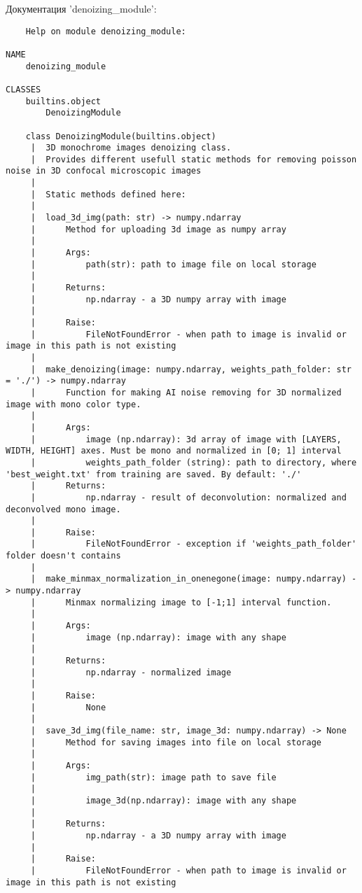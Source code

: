 Документация 'denoizing\_module':
\begin{lstlisting}
	Help on module denoizing_module:

NAME
    denoizing_module

CLASSES
    builtins.object
        DenoizingModule
    
    class DenoizingModule(builtins.object)
     |  3D monochrome images denoizing class.
     |  Provides different usefull static methods for removing poisson noise in 3D confocal microscopic images
     |  
     |  Static methods defined here:
     |  
     |  load_3d_img(path: str) -> numpy.ndarray
     |      Method for uploading 3d image as numpy array
     |      
     |      Args:
     |          path(str): path to image file on local storage
     |      
     |      Returns:
     |          np.ndarray - a 3D numpy array with image
     |      
     |      Raise:
     |          FileNotFoundError - when path to image is invalid or image in this path is not existing
     |  
     |  make_denoizing(image: numpy.ndarray, weights_path_folder: str = './') -> numpy.ndarray
     |      Function for making AI noise removing for 3D normalized image with mono color type.
     |      
     |      Args:
     |          image (np.ndarray): 3d array of image with [LAYERS, WIDTH, HEIGHT] axes. Must be mono and normalized in [0; 1] interval
     |          weights_path_folder (string): path to directory, where 'best_weight.txt' from training are saved. By default: './'
     |      Returns:
     |          np.ndarray - result of deconvolution: normalized and deconvolved mono image.
     |      
     |      Raise:
     |          FileNotFoundError - exception if 'weights_path_folder' folder doesn't contains
     |  
     |  make_minmax_normalization_in_onenegone(image: numpy.ndarray) -> numpy.ndarray
     |      Minmax normalizing image to [-1;1] interval function.
     |      
     |      Args:
     |          image (np.ndarray): image with any shape
     |      
     |      Returns:
     |          np.ndarray - normalized image
     |      
     |      Raise:
     |          None
     |  
     |  save_3d_img(file_name: str, image_3d: numpy.ndarray) -> None
     |      Method for saving images into file on local storage
     |      
     |      Args:
     |          img_path(str): image path to save file
     |      
     |          image_3d(np.ndarray): image with any shape
     |      
     |      Returns:
     |          np.ndarray - a 3D numpy array with image
     |      
     |      Raise:
     |          FileNotFoundError - when path to image is invalid or image in this path is not existing

\end{lstlisting}
